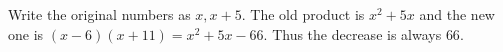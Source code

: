 Write the original numbers as $ x,x+5 $. The old product is $ x^2+5x $ and the new one is $(x-6)(x+11)=x^2+5x-66 $. Thus the decrease is always $\boxed{66}$.
